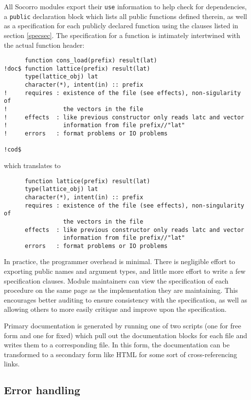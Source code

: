 All Socorro modules export their \verb+use+ information to help check
for dependencies, a \verb+public+ declaration block which lists all
public functions defined therein, as well as a specification for each
publicly declared function using the clauses listed in section
\ref{specsec}.  The specification for a function is intimately
intertwined with the actual function header:

\begin{verbatim}
      function cons_load(prefix) result(lat)
!doc$ function lattice(prefix) result(lat)
      type(lattice_obj) lat
      character(*), intent(in) :: prefix
!     requires : existence of the file (see effects), non-sigularity of
!                the vectors in the file
!     effects  : like previous constructor only reads latc and vector
!                information from file prefix//"lat"
!     errors   : format problems or IO problems

!cod$
\end{verbatim}
which translates to
\begin{verbatim}
      function lattice(prefix) result(lat)
      type(lattice_obj) lat
      character(*), intent(in) :: prefix
      requires : existence of the file (see effects), non-singularity of
                 the vectors in the file
      effects  : like previous constructor only reads latc and vector
                 information from file prefix//"lat"
      errors   : format problems or IO problems
\end{verbatim}

In practice, the programmer overhead is minimal.  There is negligible
effort to exporting public names and argument types, and little more
effort to write a few specification clauses.  Module maintainers can
view the specification of each procedure on the same page as the
implementation they are maintaining.  This encourages better auditing
to ensure consistency with the specification, as well as allowing
others to more easily critique and improve upon the specification.

Primary documentation is generated by running one of two scripts (one
for free form and one for fixed) which pull out the documentation
blocks for each file and writes them to a corresponding file.  In
this form, the documentation can be transformed to a secondary form like HTML
for some sort of cross-referencing links.

\subsection{Error handling}

